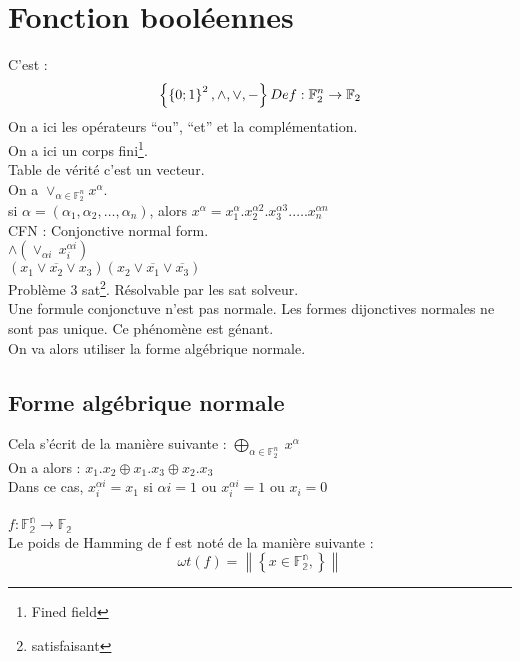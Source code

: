 \section{Fonction booléennes}
C'est :
\begin{equation}
 \left\{\left\{0;1\right\} ^{2}, \wedge, \vee, -\right\} \\
  Def :  \mathbb{F}_2^n \rightarrow \mathbb{F}_2
\end{equation}
On a ici les opérateurs \enquote{ou}, \enquote{et} et la complémentation.\\
On a ici un corps fini\footnote{Fined field}.\\
Table de vérité c'est un vecteur.\\
On a $\vee_{\alpha\in\mathbb{F}_2^n}x^\alpha$.\\
si $\alpha=(\alpha_1, \alpha_2, \ldots, \alpha_n)$, alors $x^\alpha=x_1^{\alpha}.x_2^{\alpha2}.x_3^{\alpha3}.\ldots.x_n^{\alpha n}$\\
CFN : Conjonctive normal form.\\
$\wedge(\vee_{\alpha i}~x_i^{\alpha i})$\\
$ (x_1\vee \overline{x_2} \vee x_3)(x_2 \vee \overline{x_1} \vee \overline{x_3}) $\\
Problème 3 sat\footnote{satisfaisant}. Résolvable par les sat solveur.\\
Une formule conjonctuve n'est pas normale. Les formes dijonctives normales ne sont pas unique. Ce phénomène est génant.\\
On va alors utiliser la forme algébrique normale.
\subsection{Forme algébrique normale}
Cela s'écrit de la manière suivante : $\bigoplus_{\alpha\in\mathbb{F}_2^n}~x^\alpha$\\
On a alors : $x_1.x_2\oplus x_1.x_3\oplus x_2.x_3$\\
Dans ce cas, $x_i^{\alpha i}=x_1$ si $\alpha i =1$ ou $x_i^{\alpha i}=1$ ou $x_i=0$\\~\\

$f: \mathbb{F_2^n}\rightarrow\mathbb{F_2}$\\
Le poids de Hamming de f est noté de la manière suivante :
\begin{equation}
 \omega t(f)=\left\|\left\{x\in\mathbb{F_2^n},  \right\}\right\|
\end{equation}


